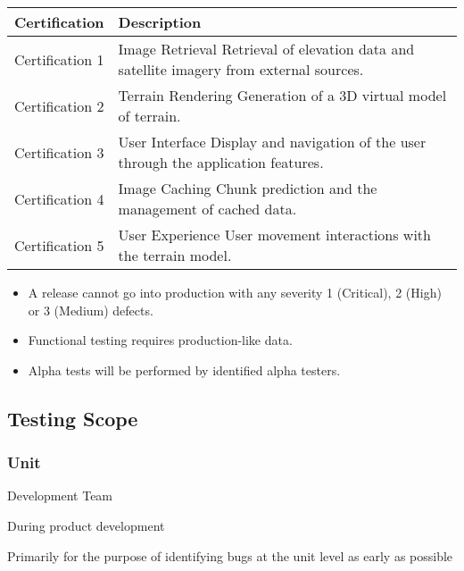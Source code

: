 \documentclass[letterpaper,10pt,english,openany,oneside]{sphinxmanual}
\begin{document}
\begin{savenotes}\sphinxattablestart
\centering
\begin{tabulary}{\linewidth}[t]{|T|T|}
\hline
\sphinxstyletheadfamily 
Certification
&\sphinxstyletheadfamily 
Description
\\
\hline
Certification 1
&
Image Retrieval
Retrieval of elevation data and satellite imagery from external sources.
\\
\hline
Certification 2
&
Terrain Rendering
Generation of a 3D virtual model of terrain.
\\
\hline
Certification 3
&
User Interface
Display and navigation of the user through the application features.
\\
\hline
Certification 4
&
Image Caching
Chunk prediction and the management of cached data.
\\
\hline
Certification 5
&
User Experience
User movement interactions with the terrain model.
\\
\hline
\end{tabulary}
\par
\sphinxattableend\end{savenotes}
\begin{itemize}
\item {} 
A release cannot go into production with any severity 1 (Critical), 2 (High) or 3 (Medium) defects.

\item {} 
Functional testing requires production-like data.

\item {} 
Alpha tests will be performed by identified alpha testers.

\end{itemize}


\subsection{Testing Scope}
\label{\detokenize{test_plan/strategy:testing-scope}}

\subsubsection{Unit}
\label{\detokenize{test_plan/strategy:unit}}
 Development Team

 During product development

 Primarily for the purpose of identifying bugs at the unit level as early as possible
\end{document}

